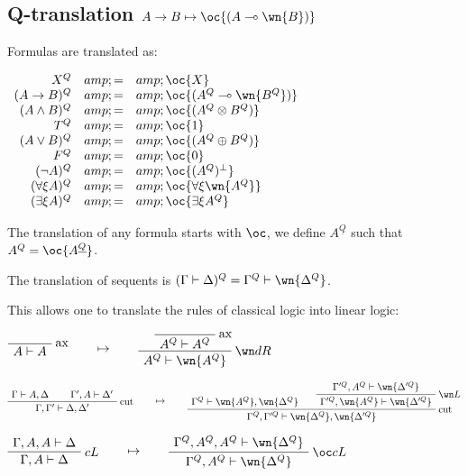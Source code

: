 \subsection{\texorpdfstring{Q-translation \(A\imp B \mapsto \oc{(A\limp\wn{B})}\)}{Q-translation A\textbackslash{}imp B \textbackslash{}mapsto \textbackslash{}oc\{(A\textbackslash{}limp\textbackslash{}wn\{B\})\}}}\label{q-translation-aimp-b-mapsto-ocalimpwnb}

Formulas are translated as:

\(\begin{array}{rcl}
X^Q &amp; = &amp; \oc{X} \\
(A\imp B)^Q &amp; = &amp; \oc{(A^Q\limp\wn{B^Q})} \\
(A\wedge B)^Q &amp; = &amp; \oc{(A^Q \tens B^Q)} \\
T^Q &amp; = &amp; \oc{\one} \\
(A\vee B)^Q &amp; = &amp; \oc{(A^Q\plus B^Q)} \\
F^Q &amp; = &amp; \oc{\zero} \\
(\neg A)^Q &amp; = &amp; \oc{(A^Q)\orth} \\
(\forall\xi A)^Q &amp; = &amp; \oc{\forall\xi \wn{A^Q}} \\
(\exists\xi A)^Q &amp; = &amp; \oc{\exists\xi A^Q}
\end{array}\)

The translation of any formula starts with \(\oc\), we define
\(A^{\underline{Q}}\) such that \(A^Q=\oc{A^{\underline{Q}}}\).

The translation of sequents is
\((\Gamma\vdash\Delta)^Q = \Gamma^Q\vdash\wn{\Delta^Q}\).

This allows one to translate the rules of classical logic into linear
logic:

\(\LabelRule{\rulename{ax}}
\NulRule{A\vdash A}
\DisplayProof
\qquad\mapsto\qquad
\LabelRule{\rulename{ax}}
\NulRule{A^Q\vdash A^Q}
\LabelRule{\wn d R}
\UnaRule{A^Q\vdash \wn{A^Q}}
\DisplayProof\)

\(\AxRule{\Gamma\vdash A,\Delta}
\AxRule{\Gamma',A\vdash \Delta'}
\LabelRule{\rulename{cut}}
\BinRule{\Gamma,\Gamma'\vdash \Delta,\Delta'}
\DisplayProof
\qquad\mapsto\qquad
\AxRule{\Gamma^Q\vdash \wn{A^Q},\wn{\Delta^Q}}
\AxRule{\Gamma'^Q,A^Q\vdash \wn{\Delta'^Q}}
\LabelRule{\wn L}
\UnaRule{\Gamma'^Q,\wn{A^Q}\vdash \wn{\Delta'^Q}}
\LabelRule{\rulename{cut}}
\BinRule{\Gamma^Q,\Gamma'^Q\vdash \wn{\Delta^Q},\wn{\Delta'^Q}}
\DisplayProof\)

\(\AxRule{\Gamma,A,A\vdash \Delta}
\LabelRule{c L}
\UnaRule{\Gamma,A\vdash \Delta}
\DisplayProof
\qquad\mapsto\qquad
\AxRule{\Gamma^Q,A^Q,A^Q\vdash \wn{\Delta^Q}}
\LabelRule{\oc c L}
\UnaRule{\Gamma^Q,A^Q\vdash \wn{\Delta^Q}}
\DisplayProof\)

